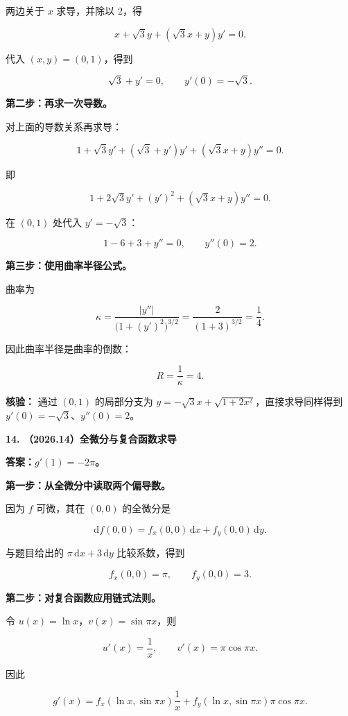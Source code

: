 \documentclass[UTF8,11pt,fontset=windows]{ctexart}
\begin{document}
两边关于 $x$ 求导，并除以 $2$，得

$$
x+\sqrt3y+(\sqrt3x+y)y'=0.
$$

代入 $(x,y)=(0,1)$，得到

$$
\sqrt3+y'=0,
\qquad y'(0)=-\sqrt3.
$$

\textbf{第二步：再求一次导数。}

对上面的导数关系再求导：

$$
1+\sqrt3y'+(\sqrt3+y')y'+(\sqrt3x+y)y''=0.
$$

即

$$
1+2\sqrt3y'+(y')^2+(\sqrt3x+y)y''=0.
$$

在 $(0,1)$ 处代入 $y'=-\sqrt3$：

$$
1-6+3+y''=0,
\qquad y''(0)=2.
$$

\textbf{第三步：使用曲率半径公式。}

曲率为

$$
\kappa=\frac{|y''|}{\bigl(1+(y')^2\bigr)^{3/2}}
=\frac2{(1+3)^{3/2}}=\frac14.
$$

因此曲率半径是曲率的倒数：

$$
\boxed{R=\frac1\kappa=4}.
$$

\textbf{核验：} 通过 $(0,1)$ 的局部分支为 $y=-\sqrt3x+\sqrt{1+2x^2}$，直接求导同样得到 $y'(0)=-\sqrt3$、$y''(0)=2$。

\clearpage

\textbf{14. （2026.14）全微分与复合函数求导}

\textbf{答案：$g'(1)=-2\pi$。}

\textbf{第一步：从全微分中读取两个偏导数。}

因为 $f$ 可微，其在 $(0,0)$ 的全微分是

$$
\mathrm{d}f(0,0)=f_x(0,0)\,\mathrm{d}x+f_y(0,0)\,\mathrm{d}y.
$$

与题目给出的 $\pi\,\mathrm{d}x+3\,\mathrm{d}y$ 比较系数，得到

$$
f_x(0,0)=\pi,\qquad f_y(0,0)=3.
$$

\textbf{第二步：对复合函数应用链式法则。}

令 $u(x)=\ln x$，$v(x)=\sin\pi x$，则

$$
u'(x)=\frac1x,\qquad v'(x)=\pi\cos\pi x.
$$

因此

$$
g'(x)=f_x(\ln x,\sin\pi x)\frac1x
+f_y(\ln x,\sin\pi x)\pi\cos\pi x.
$$
\end{document}
